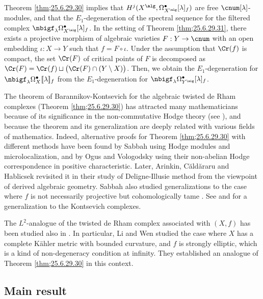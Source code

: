 \documentclass[a4,10pt]{article}
\begin{document}
Theorem \ref{thm;25.6.29.30} implies that
$H^j(X^{\alg},\Omega_{X^{\alg}}^{\bullet}[\lambda]_f)$
are free $\cnum[\lambda]$-modules,
and that 
the $E_1$-degeneration
of the spectral sequence
for the filtered complex
$\nbigf_{\lambda}\Omega^{\bullet}_{X^{\alg}}[\lambda]_f$.
In the setting of Theorem \ref{thm;25.6.29.31},
there exists a projective morphism
of algebraic varieties
$F:Y\to \cnum$ 
with an open embedding
$\iota:X\to Y$ such that $f=F\circ\iota$.
Under the assumption that $\Cr(f)$ is compact,
the set $\Cr(F)$ of critical points of $F$
is decomposed as
$\Cr(F)=\Cr(f)\sqcup\bigl(
\Cr(F)\cap(Y\setminus X)\bigr)$.
Then, we obtain the $E_1$-degeneration for
$\nbigf_{\lambda}\Omega^{\bullet}_X[\![\lambda]\!]_f$
from the $E_1$-degeneration for
$\nbigf_{\lambda}\Omega^{\bullet}_{Y^{\alg}}[\lambda]_f$.


The theorem of Barannikov-Kontsevich
for the algebraic twisted de Rham complexes
(Theorem \ref{thm;25.6.29.30})
has attracted many mathematicians
because of its significance
in the non-commutative Hodge theory
(see \cite{Katzarkov-Kontsevich-Pantev-2017}),
and because the theorem and its generalization are
deeply related with various fields of mathematics.
Indeed,
alternative proofs
for Theorem \ref{thm;25.6.29.30}
with different methods have been found
by Sabbah \cite{Sabbah-twisted-de-Rham}
using Hodge modules and microlocalization,
and by Ogus and Vologodsky \cite{Ogus-Vologodsky}
using their non-abelian Hodge correspondence
in positive characteristic.
Later,
Arinkin, C\u{a}ld\u{a}raru and Hablicsek
\cite{Arinkin-Caldararu-Hablicsek}
revisited it in their study of
Deligne-Illusie method from
the viewpoint of derived algebraic geometry.
Sabbah also studied generalizations
to the case where $f$ is not necessarily projective
but cohomologically tame \cite{Sabbah-tame-polynomial}.
See \cite{Esnault-Sabbah-Yu} and
\cite{Mochizuki-Kontsevich-complexes}
for a generalization to the Kontsevich complexes.

The $L^2$-analogue 
of the twisted de Rham complex associated with $(X,f)$
has been studied
also in \cite{Fan,Li-Wen}.
In particular,
Li and Wen \cite{Li-Wen} studied the case
where $X$ has a complete K\"ahler metric
with bounded curvature,
and $f$ is strongly elliptic,
which is
a kind of non-degeneracy condition
at infinity.
They established
an analogue of Theorem \ref{thm;25.6.29.30}
in this context.

\subsection{Main result}
\end{document}
